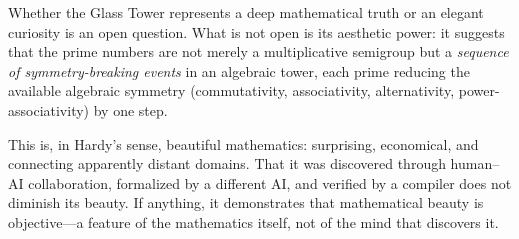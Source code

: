 Whether the Glass Tower represents a deep mathematical truth or
an elegant curiosity is an open question. What is not open is
its aesthetic power: it suggests that the prime numbers are not
merely a multiplicative semigroup but a \emph{sequence of
symmetry-breaking events} in an algebraic tower, each prime
reducing the available algebraic symmetry (commutativity,
associativity, alternativity, power-associativity) by one step.

This is, in Hardy's sense, beautiful mathematics: surprising,
economical, and connecting apparently distant domains. That it
was discovered through human--AI collaboration, formalized by
a different AI, and verified by a compiler does not diminish
its beauty. If anything, it demonstrates that mathematical beauty
is objective---a feature of the mathematics itself, not of the
mind that discovers it.
